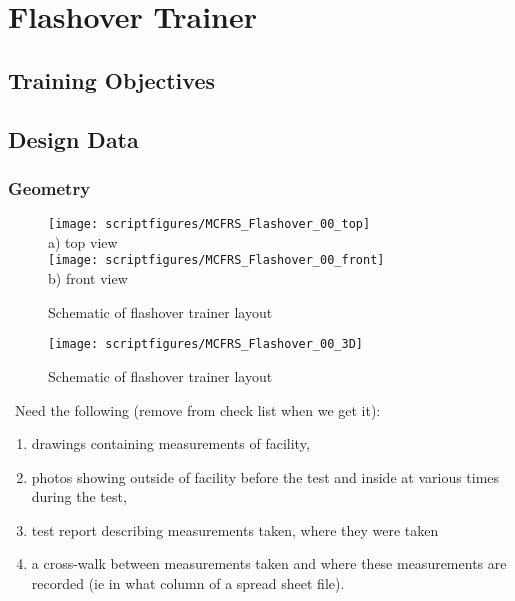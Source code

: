 \chapter{Flashover Trainer}

\section{Training Objectives}

\section{Design Data}
\subsection{Geometry}
\begin{figure}[\figoptions]
\begin{center}
\texttt{[image: scriptfigures/MCFRS\_Flashover\_00\_top]}\\
a) top view\\
\texttt{[image: scriptfigures/MCFRS\_Flashover\_00\_front]}\\
b) front view\\
\end{center}
\caption {Schematic of flashover trainer layout}
\label{figflashoverplan}%
\end{figure}

\begin{figure}[\figoptions]
\begin{center}
\texttt{[image: scriptfigures/MCFRS\_Flashover\_00\_3D]}\\
\end{center}
\caption {Schematic of flashover trainer layout}
\label{figflashoverplan}%
\end{figure}

\note\ Need the following (remove from check list when we get it):
\begin{enumerate}
\item drawings containing measurements of facility,
\item photos showing outside of facility before the test and inside at various times during the test,
\item test report describing
measurements taken, where they were taken
\item a cross-walk between measurements taken and where these measurements are recorded (ie
in what column of a spread sheet file).
\end{enumerate}

